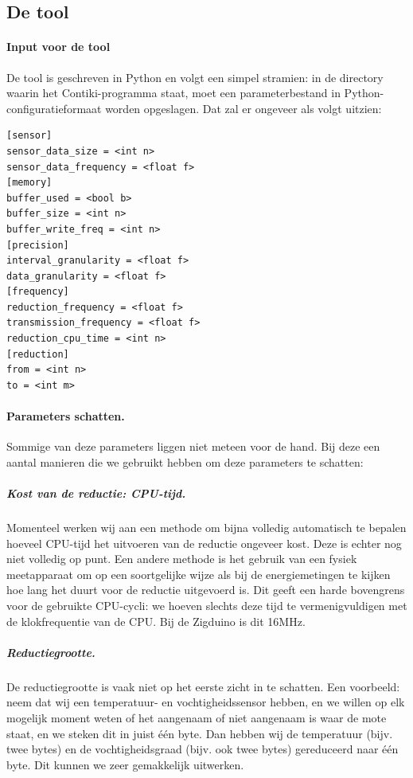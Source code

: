 \documentclass{article}
\begin{document}
\subsection{De tool}

\paragraph{Input voor de tool}
De tool is geschreven in Python en volgt een simpel stramien: in de directory
waarin het Contiki-programma staat, moet een parameterbestand in
Python-configuratieformaat worden opgeslagen. Dat zal er ongeveer als volgt
uitzien:

\begin{verbatim}
[sensor]
sensor_data_size = <int n>
sensor_data_frequency = <float f>
[memory]
buffer_used = <bool b>
buffer_size = <int n>
buffer_write_freq = <int n>
[precision]
interval_granularity = <float f>
data_granularity = <float f>
[frequency]
reduction_frequency = <float f>
transmission_frequency = <float f>
reduction_cpu_time = <int n>
[reduction]
from = <int n>
to = <int m>
\end{verbatim}

\paragraph{Parameters schatten.} Sommige van deze parameters liggen niet meteen
voor de hand. Bij deze een aantal manieren die we gebruikt hebben om deze
parameters te schatten:

\subparagraph{Kost van de reductie: CPU-tijd.} Momenteel werken wij aan een
methode om bijna volledig automatisch te bepalen hoeveel CPU-tijd het uitvoeren
van de reductie ongeveer kost. Deze is echter nog niet volledig op punt. Een
andere methode is het gebruik van een fysiek meetapparaat om op een soortgelijke
wijze als bij de energiemetingen te kijken hoe lang het duurt voor de reductie
uitgevoerd is. Dit geeft een harde bovengrens voor de gebruikte CPU-cycli: we
hoeven slechts deze tijd te vermenigvuldigen met de klokfrequentie van de
CPU. Bij de Zigduino is dit 16MHz.

\subparagraph{Reductiegrootte.} De reductiegrootte is vaak
niet op het eerste zicht in te schatten. Een voorbeeld: neem dat wij een
temperatuur- en vochtigheidssensor hebben, en we willen op elk mogelijk moment
weten of het aangenaam of niet aangenaam is waar de mote staat, en we steken dit
in juist één byte. Dan hebben wij de temperatuur (bijv. twee bytes) en de
vochtigheidsgraad (bijv. ook twee bytes) gereduceerd naar \'e\'en byte. Dit
kunnen we zeer gemakkelijk uitwerken.
\end{document}

